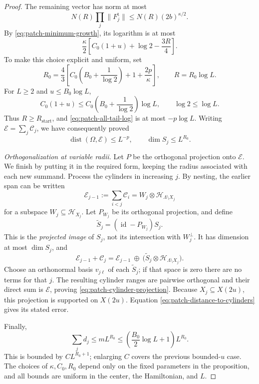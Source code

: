 \documentclass[11pt]{article}
\numberwithin{equation}{section}
\theoremstyle{definition}
\theoremstyle{remark}
\DeclareMathOperator{\dist}{dist}
\DeclareMathOperator{\id}{id}
\newcommand{\norm}[1]{\lVert #1\rVert}
\begin{document}
\begin{proof}
The remaining vector has norm at most
\[
 N(R)\prod_j\norm{F_j^{\mathrm t}}
       \leq N(R)(2b)^{\kappa/2}.
\]
By \eqref{eq:patch-minimum-growth}, its logarithm is at most
\begin{equation}
 \frac{\kappa}{2}
       \left[C_0(1+u)+\log2-\frac{3R}{4}\right].
 \label{eq:patch-all-tail-log}
\end{equation}
To make this choice explicit and uniform, set
\begin{equation}
 R_0=\frac43\left[
           C_0\left(B_0+\frac1{\log2}\right)
                 +1+\frac{2p}{\kappa}\right],
 \qquad R=R_0\log L.
 \label{eq:patch-explicit-radius}
\end{equation}
For \(L\geq2\) and \(u\leq B_0\log L\),
\[
 C_0(1+u)\leq
       C_0\left(B_0+\frac1{\log2}\right)\log L,
 \qquad \log2\leq\log L.
\]
Thus \(R\geq R_{\mathrm{start}}\), and
\eqref{eq:patch-all-tail-log} is at most \(-p\log L\).
Writing \(\mathcal E=\sum_j\mathcal C_j\), we have consequently
proved
\begin{equation}
 \dist(\Omega,\mathcal E)\leq L^{-p},
 \qquad
 \dim S_j\leq L^{R_0}.
 \label{eq:patch-distance-to-cylinders}
\end{equation}

\emph{Orthogonalization at variable radii.}
Let \(P\) be the orthogonal projection onto \(\mathcal E\).
We finish by putting it in the required form, keeping the radius
associated with each new summand.  Process the cylinders in
increasing \(j\).  By nesting, the earlier span can be written
\[
 \mathcal E_{j-1}:=\sum_{i<j}\mathcal C_i
       =W_j\otimes\mathcal H_{\Lambda\setminus X_j}
\]
for a subspace \(W_j\subseteq\mathcal H_{X_j}\).
Let \(P_{W_j}\) be its orthogonal projection, and define
\[
 \widetilde S_j=(\id-P_{W_j})S_j.
\]
This is the \emph{projected image} of \(S_j\), not its intersection
with \(W_j^\perp\).  It has dimension at most \(\dim S_j\), and
\[
 \mathcal E_{j-1}+\mathcal C_j
    =\mathcal E_{j-1}\ \mathbin{\oplus}\
       \bigl(\widetilde S_j
                    \otimes\mathcal H_{\Lambda\setminus X_j}\bigr).
\]
Choose an orthonormal basis \(v_{j\ell}\) of each
\(\widetilde S_j\); if that space is zero there are no terms for
that \(j\).  The resulting cylinder ranges are pairwise orthogonal
and their direct sum is \(\mathcal E\), proving
\eqref{eq:patch-cylinder-projection}.  Because \(X_j\subseteq X(2u)\),
this projection is supported on \(X(2u)\).  Equation
\eqref{eq:patch-distance-to-cylinders} gives its stated error.

Finally,
\[
 \sum_j d_j\leq mL^{R_0}
       \leq \left(\frac{B_0}{2}\log L+1\right)L^{R_0}.
\]
This is bounded by \(C L^{R_0+1}\); enlarging \(C\) covers the
previous bounded-\(u\) case.  The choices of \(\kappa,C_0,R_0\)
depend only on the fixed parameters in the proposition, and all
bounds are uniform in the center, the Hamiltonian, and \(L\).
\end{proof}
\end{document}
